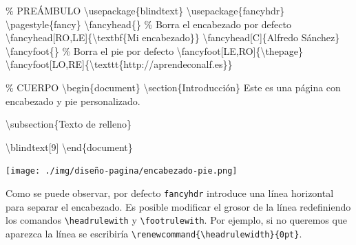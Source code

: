 \documentclass[
  letterpaper,
  DIV=11,
  numbers=noendperiod]{scrreport}
\newenvironment{Shaded}{\begin{snugshade}}{\end{snugshade}}
\newcommand{\BuiltInTok}[1]{\textcolor[rgb]{0.00,0.23,0.31}{#1}}
\newcommand{\CommentTok}[1]{\textcolor[rgb]{0.37,0.37,0.37}{#1}}
\newcommand{\ExtensionTok}[1]{\textcolor[rgb]{0.00,0.23,0.31}{#1}}
\newcommand{\FunctionTok}[1]{\textcolor[rgb]{0.28,0.35,0.67}{#1}}
\newcommand{\KeywordTok}[1]{\textcolor[rgb]{0.00,0.23,0.31}{#1}}
\newcommand{\NormalTok}[1]{\textcolor[rgb]{0.00,0.23,0.31}{#1}}
\begin{document}
\begin{Shaded}
\begin{Highlighting}[]
\CommentTok{\% PREÁMBULO}
\BuiltInTok{\textbackslash{}usepackage}\NormalTok{\{}\ExtensionTok{blindtext}\NormalTok{\}}
\BuiltInTok{\textbackslash{}usepackage}\NormalTok{\{}\ExtensionTok{fancyhdr}\NormalTok{\}}
\FunctionTok{\textbackslash{}pagestyle}\NormalTok{\{fancy\}}
\FunctionTok{\textbackslash{}fancyhead}\NormalTok{\{\} }\CommentTok{\% Borra el encabezado por defecto}
\FunctionTok{\textbackslash{}fancyhead}\NormalTok{[RO,LE]\{}\FunctionTok{\textbackslash{}textbf}\NormalTok{\{Mi encabezado\}\}}
\FunctionTok{\textbackslash{}fancyhead}\NormalTok{[C]\{Alfredo Sánchez\}}
\FunctionTok{\textbackslash{}fancyfoot}\NormalTok{\{\} }\CommentTok{\% Borra el pie por defecto}
\FunctionTok{\textbackslash{}fancyfoot}\NormalTok{[LE,RO]\{}\FunctionTok{\textbackslash{}thepage}\NormalTok{\}}
\FunctionTok{\textbackslash{}fancyfoot}\NormalTok{[LO,RE]\{}\FunctionTok{\textbackslash{}texttt}\NormalTok{\{http://aprendeconalf.es\}\}}

\CommentTok{\% CUERPO}
\KeywordTok{\textbackslash{}begin}\NormalTok{\{}\ExtensionTok{document}\NormalTok{\}}
\KeywordTok{\textbackslash{}section}\NormalTok{\{Introducción\}}
\NormalTok{Este es una página con encabezado y pie personalizado.}

\KeywordTok{\textbackslash{}subsection}\NormalTok{\{Texto de relleno\}}

\FunctionTok{\textbackslash{}blindtext}\NormalTok{[9]}
\KeywordTok{\textbackslash{}end}\NormalTok{\{}\ExtensionTok{document}\NormalTok{\}}
\end{Highlighting}
\end{Shaded}

\begin{tcolorbox}[enhanced jigsaw, arc=.35mm, toprule=.15mm, opacitybacktitle=0.6, colback=white, coltitle=black, colbacktitle=quarto-callout-note-color!10!white, breakable, colframe=quarto-callout-note-color-frame, left=2mm, opacityback=0, bottomtitle=1mm, toptitle=1mm, titlerule=0mm, title={Salida}, bottomrule=.15mm, leftrule=.75mm, rightrule=.15mm]
\texttt{[image: ./img/diseño-pagina/encabezado-pie.png]}
\end{tcolorbox}

Como se puede observar, por defecto \texttt{fancyhdr} introduce una
línea horizontal para separar el encabezado. Es posible modificar el
grosor de la línea redefiniendo los comandos
\texttt{\textbackslash{}headrulewith} y
\texttt{\textbackslash{}footrulewith}. Por ejemplo, si no queremos que
aparezca la línea se escribiría
\texttt{\textbackslash{}renewcommand\{\textbackslash{}headrulewidth\}\{0pt\}}.
\end{document}
